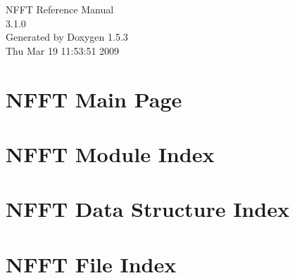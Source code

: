 \documentclass[a4paper]{book}
\begin{document}
\begin{titlepage}
\vspace*{7cm}
\begin{center}
{\Large NFFT Reference Manual\\[1ex]\large 3.1.0 }\\
\vspace*{1cm}
{\large Generated by Doxygen 1.5.3}\\
\vspace*{0.5cm}
{\small Thu Mar 19 11:53:51 2009}\\
\end{center}
\end{titlepage}
\clearemptydoublepage
{}
\tableofcontents
\clearemptydoublepage
{}
\chapter{NFFT Main Page}
\label{index}\hypertarget{index}{}
\chapter{NFFT Module Index}

\chapter{NFFT Data Structure Index}

\chapter{NFFT File Index}

\end{document}
